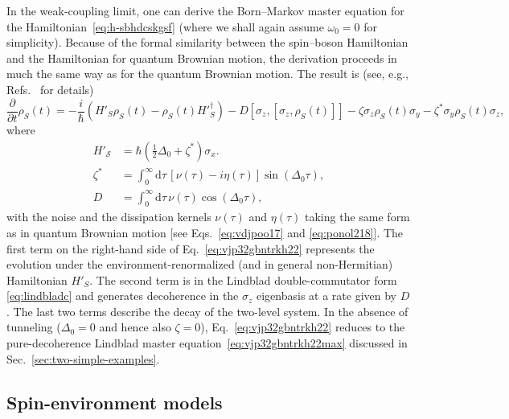 \documentclass[3p,sort&compress]{elsarticle}
\newcommand{\D}{\ensuremath{\mathrm{d}}}
\newcommand{\I}{\ensuremath{i}}
\newcommand{\op}[1]{#1}
\begin{document}
In the weak-coupling limit, one can derive the Born--Markov master equation for the Hamiltonian~\eqref{eq:h-sbhdcskgsf} (where we shall again assume $\omega_0=0$ for simplicity). Because of the formal similarity between the spin--boson Hamiltonian and the Hamiltonian for quantum Brownian motion, the derivation proceeds in much the same way as for the quantum Brownian motion. The result is (see, e.g., Refs.~\cite{Paz:2001:aa,Schlosshauer:2007:un} for details)
%
\begin{equation}
\label{eq:vjp32gbntrkh22}
\frac{\partial}{\partial t} \op{\rho}_S(t) = -\frac{\I}{\hbar} \left(
  \op{H}'_S \op{\rho}_S(t) - {\op{\rho}}_S(t)
  H'^\dagger_S \right) - D \left[
  \sigma_z, \left[ \sigma_z, \op{\rho}_S(t)
  \right]\right] - \zeta \sigma_z
\op{\rho}_S(t)\sigma_y - \zeta^* \sigma_y
\op{\rho}_S(t)\sigma_z,
\end{equation}
%
where
%
\begin{subequations}
\begin{align}
  \op{H}'_\mathcal{S} &= \hbar\left(  \frac{1}{2}
  \Delta_0 + \zeta^* \right) \op{\sigma}_x. \\
  \zeta^* &= \int_0^\infty \D \tau \, \left[\nu(\tau) - \I \eta(\tau)\right] \sin\left( \Delta_0 \tau \right), \\
  D &= \int_0^\infty \D \tau \,
  \nu(\tau) \cos\left( \Delta_0 \tau \right),
\end{align}
\end{subequations}
%
with the noise and the dissipation kernels $\nu(\tau)$ and $\eta(\tau)$ taking the same form as in quantum Brownian motion [see Eqs.~\eqref{eq:vdjpoo17} and \eqref{eq:ponol218}]. The first term on the right-hand side of Eq.~\eqref{eq:vjp32gbntrkh22} represents the evolution under the environment-renormalized (and in general non-Hermitian) Hamiltonian $\op{H}'_S$. The second term is in the Lindblad double-commutator form \eqref{eq:lindbladc} and generates decoherence in the $\sigma_z$ eigenbasis at a rate given by $D$. The last two terms describe the decay of the two-level system. In the absence of tunneling ($\Delta_0=0$ and hence also $\zeta=0$), Eq.~\eqref{eq:vjp32gbntrkh22} reduces to the pure-decoherence Lindblad master equation~\eqref{eq:vjp32gbntrkh22max} discussed in Sec.~\ref{sec:two-simple-examples}.


\subsection{\label{sec:spin-envir-models}Spin-environment models}
\end{document}
